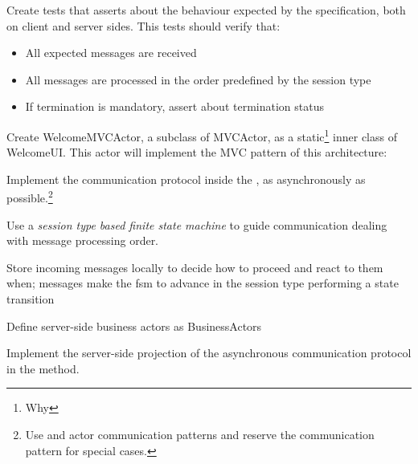 \begin{feature}
  \begin{task}
    Create tests that asserts about the behaviour expected by the
    specification, both on client and server sides. This tests should
    verify that:
    \begin{itemize}
    \item All expected messages are received\\
    \item All messages are processed in the order predefined by the
      session type
    \item If termination is mandatory, assert about termination status
    \end{itemize}
  \end{task}



\begin{task}
  Create WelcomeMVCActor, a subclass of MVCActor, as a
  static\footnote{Why } inner class of WelcomeUI. This
  actor will implement the MVC pattern of this architecture:
  \begin{task}
    Implement the communication protocol inside the
    , as asynchronously as possible.\footnote{Use
       and  actor communication patterns and
      reserve the  communication pattern for special cases.}
  \end{task}
  \begin{task}
    Use a \emph{session type based finite state machine} to guide
    communication dealing with message processing order.
  \end{task}
  \begin{task}
    Store incoming messages locally to decide how to proceed and react
    to them when; messages make the fsm to advance in the session type
    performing a state transition
  \end{task}
  \begin{task}
    Define server-side business actors as BusinessActors
  \end{task}
  \begin{task}
    Implement the server-side projection of the asynchronous
    communication protocol in the  method.
  \end{task}
\end{task}
%


\end{feature}




